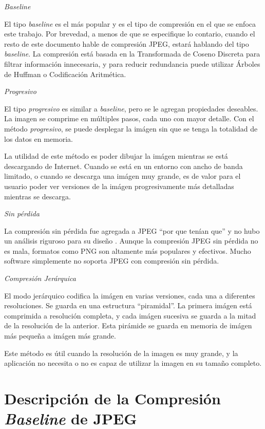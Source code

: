 \begin{list}{}{}
\item \emph{Baseline}

El tipo \emph{baseline} es el más popular y es el tipo de compresión en el que se enfoca este trabajo. Por brevedad, a menos de que se especifique lo contario, cuando el resto de este documento hable de compresión JPEG, estará hablando del tipo \emph{baseline}. La compresión está basada en la Transformada de Coseno Discreta para filtrar información innecesaria, y para reducir redundancia puede utilizar Árboles de Huffman o Codificación Aritmética.

\item \emph{Progresivo}

El tipo \emph{progresivo} es similar a \emph{baseline}, pero se le agregan propiedades deseables. La imagen se comprime en múltiples pasos, cada uno con mayor detalle. Con el método \emph{progresivo}, se puede desplegar la imágen sin que se tenga la totalidad de los datos en memoria.

La utilidad de este método es poder dibujar la imágen mientras se está descargando de Internet. Cuando se está en un entorno con ancho de banda limitado, o cuando se descarga una imágen muy grande, es de valor para el usuario poder ver versiones de la imágen progresivamente más detalladas mientras se descarga.

\item \emph{Sin pérdida}

La compresión sin pérdida fue agregada a JPEG ``por que tenían que'' y no hubo un análisis riguroso para su diseño \citep{JPEGSTD}. Aunque la compresión JPEG sin pérdida no es mala, formatos como PNG son altamente más populares y efectivos. Mucho software simplemente no soporta JPEG con compresión sin pérdida.

\item \emph{Compresión Jerárquica}

El modo jerárquico codifica la imágen en varias versiones, cada una a diferentes resoluciones. Se guarda en una estructura ``piramidal''. La primera imágen está comprimida a resolución completa, y cada imágen sucesiva se guarda a la mitad de la resolución de la anterior. Esta pirámide se guarda en memoria de imágen más pequeña a imágen más grande.

Este método es útil cuando la resolución de la imagen es muy grande, y la aplicación no necesita o no es capaz de utilizar la imagen en su tamaño completo.

\end{list}

\section{Descripción de la Compresión \emph{Baseline} de JPEG}

%
